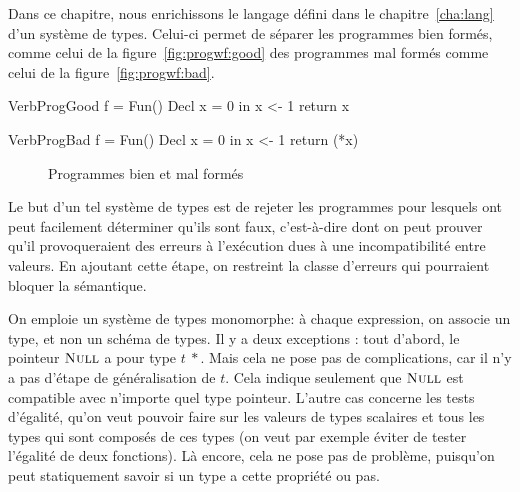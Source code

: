Dans ce chapitre, nous enrichissons le langage défini dans le
chapitre~\ref{cha:lang} d'un système de types. Celui-ci permet de séparer les
programmes bien formés, comme celui de la figure~\ref{fig:progwf:good} des
programmes mal formés comme celui de la figure~\ref{fig:progwf:bad}.

\begin{SaveVerbatim}[]{VerbProgGood}
f = Fun() {
  Decl x = 0 in
  x <- 1
  return x
}
\end{SaveVerbatim}

\begin{SaveVerbatim}[]{VerbProgBad}
f = Fun() {
  Decl x = 0 in
  x <- 1
  return (*x)
}
\end{SaveVerbatim}

\begin{figure}[h]

  \centering

  \hspace{2cm}

  \caption{Programmes bien et mal formés}
\label{fig:progwf}

\end{figure}

Le but d'un tel système de types est de rejeter les programmes pour lesquels ont
peut facilement déterminer qu'ils sont faux, c'est-à-dire dont on peut prouver
qu'il provoqueraient des erreurs à l'exécution dues à une incompatibilité entre
valeurs. En ajoutant cette étape, on restreint la classe d'erreurs qui
pourraient bloquer la sémantique.

On emploie un système de types monomorphe: à chaque expression, on associe un
type, et non un schéma de types. Il y a deux exceptions : tout d'abord, le
pointeur $\textsc{Null}$ a pour type $t~*$. Mais cela ne pose pas de complications, car
il n'y a pas d'étape de généralisation de $t$. Cela indique seulement que
$\textsc{Null}$ est compatible avec n'importe quel type pointeur. L'autre cas concerne
les tests d'égalité, qu'on veut pouvoir faire sur les valeurs de types scalaires
et tous les types qui sont composés de ces types (on veut par exemple éviter de
tester l'égalité de deux fonctions). Là encore, cela ne pose pas de problème,
puisqu'on peut statiquement savoir si un type a cette propriété ou pas.

